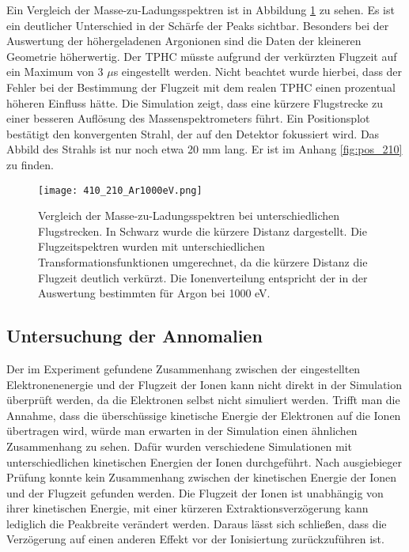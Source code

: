Ein Vergleich der Masse-zu-Ladungsspektren ist in Abbildung \ref{fig:410_210} zu sehen. Es ist ein deutlicher Unterschied in der Schärfe der Peaks sichtbar. Besonders bei der Auswertung der höhergeladenen Argonionen sind die Daten der kleineren Geometrie höherwertig. Der TPHC müsste aufgrund der verkürzten Flugzeit auf ein Maximum von 3 $\mu$s eingestellt werden. Nicht beachtet wurde hierbei, dass der Fehler bei der Bestimmung der Flugzeit mit dem realen TPHC einen prozentual höheren Einfluss hätte. Die Simulation zeigt, dass eine kürzere Flugstrecke zu einer besseren Auflösung des Massenspektrometers führt. Ein Positionsplot bestätigt den konvergenten Strahl, der auf den Detektor fokussiert wird. Das Abbild des Strahls ist nur noch etwa 20 mm lang. Er ist im Anhang \ref{fig:pos_210} zu finden.

\begin{figure}
    \centering
    \texttt{[image: 410\_210\_Ar1000eV.png]}
    \caption[Vergleich der Masse-zu-Ladungsspektren bei unterschiedlichen Flugstrecken]{Vergleich der Masse-zu-Ladungsspektren bei unterschiedlichen Flugstrecken. In Schwarz wurde die kürzere Distanz dargestellt. Die Flugzeitspektren wurden mit unterschiedlichen Transformationsfunktionen umgerechnet, da die kürzere Distanz die Flugzeit deutlich verkürzt. Die Ionenverteilung entspricht der in der Auswertung bestimmten für Argon bei 1000 eV.}
    \label{fig:410_210}
\end{figure}
\subsection{Untersuchung der Annomalien}
Der im Experiment gefundene Zusammenhang zwischen der eingestellten Elektronenenergie und der Flugzeit der Ionen kann nicht direkt in der Simulation überprüft werden, da die Elektronen selbst nicht simuliert werden. Trifft man die Annahme, dass die überschüssige kinetische Energie der Elektronen auf die Ionen übertragen wird, würde man erwarten in der Simulation einen ähnlichen Zusammenhang zu sehen. Dafür wurden verschiedene Simulationen mit unterschiedlichen kinetischen Energien der Ionen durchgeführt. Nach ausgiebieger Prüfung konnte kein Zusammenhang zwischen der kinetischen Energie der Ionen und der Flugzeit gefunden werden. Die Flugzeit der Ionen ist unabhängig von ihrer kinetischen Energie, mit einer kürzeren Extraktionsverzögerung kann lediglich die Peakbreite verändert werden. Daraus lässt sich schließen, dass die Verzögerung auf einen anderen Effekt vor der Ionisiertung zurückzuführen ist. 

